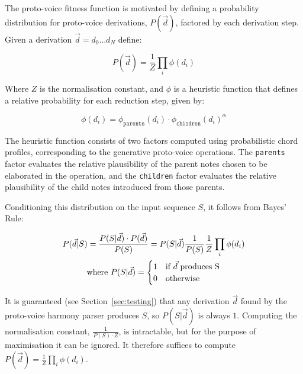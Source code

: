 \documentclass[12pt,a4paper,twoside,openany]{report} \usepackage[pdfborder={0 0 0}]{hyperref}    %
\theoremstyle{definition} \newtheorem{definition}{Definition}[section]
\begin{document}
    The proto-voice fitness function is motivated by defining a probability distribution for proto-voice
    derivations, $P(\vec{d})$, factored by each derivation step. 
    Given a derivation $\vec{d} = d_0 \dots d_N$ define: 

    \begin{equation}
      P(\vec{d}) = \frac{1}{Z} \prod_i \phi (d_i)
      \label{eq:}
    \end{equation}

    Where $Z$ is the normalisation constant, and $\phi$ is a heuristic function that defines a relative probability for each reduction step, given by:

    \begin{equation}
      \phi(d_i) = \phi_{\texttt{parents}}(d_i) \cdot \phi_{\texttt{children}}(d_i)^{\alpha}
      \label{eq:}
    \end{equation}

    The heuristic function consists of two factors computed using probabilistic chord profiles, corresponding
    to the generative proto-voice operations. 
    The \texttt{parents} factor evaluates the relative plausibility of the parent notes chosen to be elaborated in the
    operation, and the \texttt{children} factor evaluates the relative plausibility of the child notes introduced from
    those parents. 
    
    Conditioning this distribution on the input sequence $S$, it follows from Bayes' Rule: 

    \begin{equation}
      \begin{gathered}
      P(\vec{d}|S) = \frac{P(S|\vec{d})\cdot P(\vec{d})}{P(S)} = P(S|\vec{d})\frac{1}{P(S)} \frac{1}{Z} \prod_i \phi(d_i) \\
      \text{where } P(S|\vec{d}) = 
        \begin{cases} 
          1 & \text{if } \vec{d} \text{ produces } $S$ \\
          0 & \text{otherwise}
        \end{cases}
      \end{gathered}
      \label{eq:}
    \end{equation}
    
    It is guaranteed (see Section~\ref{sec:testing}) that any derivation $\vec{d}$ found by the proto-voice harmony
    parser produces $S$, so $P(S|\vec{d})$ is always $1$. Computing the normalisation constant, $\frac{1}{P(S)\cdot
    Z}$, is intractable, but for the purpose of maximisation it can be ignored. It therefore suffices to compute
    $P(\vec{d}) = \frac{1}{Z} \prod_i \phi (d_i)$. 
\end{document}
